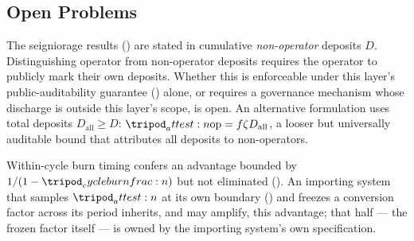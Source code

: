 \documentclass[../main.tex]{subfiles}
\begin{document}
\subsection{Open Problems}
\label{sec:limitations:open-problems}

The seigniorage results
()
are stated in cumulative \emph{non-operator} deposits $D$. Distinguishing operator from non-operator
deposits requires the operator to publicly mark their own deposits. Whether this is
enforceable under this layer's public-auditability guarantee
() alone, or requires a governance mechanism whose
discharge is outside this layer's scope, is open. An alternative formulation uses total
deposits $D_{\mathrm{all}} \geq D$:
$\attest{\opidx} = \feerate\livesplit D_{\mathrm{all}}$, a looser but universally auditable
bound that attributes all deposits to non-operators.

Within-cycle burn timing confers an advantage bounded by $1/(1-\cycleburnfrac{})$ but not
eliminated (). An importing system that samples
$\attest{}$ at its own boundary () and freezes a conversion
factor across its period inherits, and may amplify, this advantage; that half --- the frozen
factor itself --- is owned by the importing system's own specification.

\end{document}
